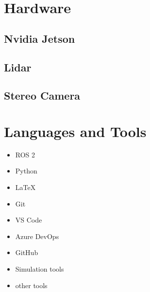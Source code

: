 \cite{planning_algorithms_steven_m_lavalle}

\section{Hardware}

\subsection{Nvidia Jetson}
\lipsum[1]

\subsection{Lidar}
\lipsum[1]

\subsection{Stereo Camera}
\lipsum[1]

\section{Languages and Tools}

\begin{itemize}
    \item ROS 2
    \item Python
    \item LaTeX
    \item Git
    \item VS Code
    \item Azure DevOps
    \item GitHub
    \item Simulation tools
    \item other tools
\end{itemize}

\lipsum[1]
